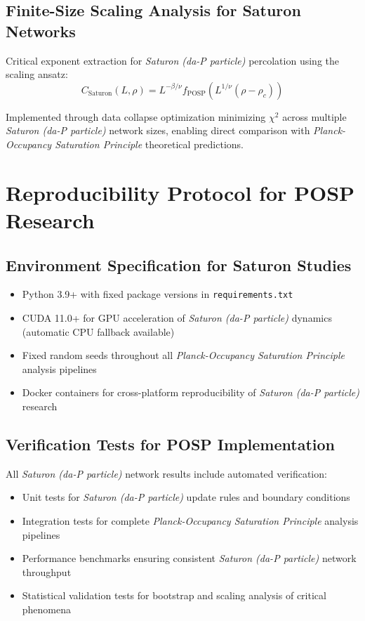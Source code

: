 \documentclass[twocolumn,showpacs,preprintnumbers,amsmath,amssymb,prb]{revtex4-2}
\newcommand{\saturon}{\textit{Saturon (da-P particle)}}
\newcommand{\posp}{\textit{Planck-Occupancy Saturation Principle}}
\begin{document}
\subsection{Finite-Size Scaling Analysis for Saturon Networks}

Critical exponent extraction for \saturon{} percolation using the scaling ansatz:
\begin{equation}
C_{\text{Saturon}}(L, \rho) = L^{-\beta/\nu} f_{\text{POSP}}\left(L^{1/\nu}(\rho - \rho_c)\right)
\end{equation}

Implemented through data collapse optimization minimizing $\chi^2$ across multiple \saturon{} network sizes, enabling direct comparison with \posp{} theoretical predictions.

\section{Reproducibility Protocol for POSP Research}
\label{app:reproducibility}

\subsection{Environment Specification for Saturon Studies}
\begin{itemize}
\item Python 3.9+ with fixed package versions in \texttt{requirements.txt}
\item CUDA 11.0+ for GPU acceleration of \saturon{} dynamics (automatic CPU fallback available)
\item Fixed random seeds throughout all \posp{} analysis pipelines
\item Docker containers for cross-platform reproducibility of \saturon{} research
\end{itemize}

\subsection{Verification Tests for POSP Implementation}
All \saturon{} network results include automated verification:
\begin{itemize}
\item Unit tests for \saturon{} update rules and boundary conditions
\item Integration tests for complete \posp{} analysis pipelines  
\item Performance benchmarks ensuring consistent \saturon{} network throughput
\item Statistical validation tests for bootstrap and scaling analysis of critical phenomena
\end{itemize}
\end{document}
